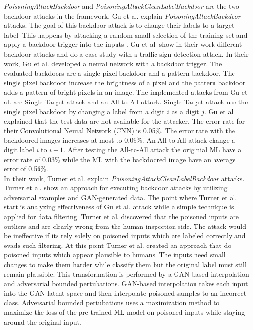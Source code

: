 \textit{PoisoningAttackBackdoor} and \textit{PoisoningAttackCleanLabelBackdoor} are the two backdoor attacks in the framework. Gu et al. \cite{DBLP:journals/corr/abs-1708-06733} explain \textit{PoisoningAttackBackdoor} attacks. The goal of this backdoor attack is to change their labels to a target label. This happens by attacking a random small selection of the training set and apply a backdoor trigger into the inputs \cite{turner2018clean}. Gu et al. show in their work different backdoor attacks and do a case study with a traffic sign detection attack. In their work, Gu et al. developed a neural network with a backdoor trigger. The evaluated backdoors are a single pixel backdoor and a pattern backdoor. The single pixel backdoor increase the brightness of a pixel and the pattern backdoor adds a pattern of bright pixels in an image. The implemented attacks from Gu et al. are Single Target attack and an All-to-All attack. Single Target attack use the single pixel backdoor by changing a label from a digit $i$ as a digit $j$. Gu et al. explained that the test data are not available for the attacker. The error rate for their Convolutional Neural Network (CNN) is 0.05\%. The error rate with the backdoored images increases at most to 0.09\%. An All-to-All attack change a digit label $i$ to $i + 1$. After testing the All-to-All attack the originial ML have a error rate of 0.03\% while the ML with the backdoored image have an average error of 0.56\%. \\
In their work, Turner et al. \cite{turner2018clean} explain
\textit{PoisoningAttackCleanLabelBackdoor} attacks. Turner et al. show an approach for executing backdoor attacks by utilizing adversarial examples and GAN-generated data. The point where Turner et al. start is analyzing effectiveness of Gu et al. attack while a simple technique is applied for data filtering. Turner et al. discovered that the poisoned inputs are outliers and are clearly wrong from the human inspection side. The attack would be ineffective if its rely solely on poisoned inputs which are labeled correctly and evade such filtering. At this point Turner et al. created an approach that do poisoned inputs which appear plausible to humans. The inputs need small changes to make them harder while classify them but the original label must still remain plausible. This transformation is performed by a GAN-based interpolation and adversarial bounded pertubations. GAN-based interpolation takes each input into the GAN latent space \cite{DBLP:conf/nips/GoodfellowPMXWOCB14} and then interpolate poisoned samples to an incorrect class. Adversarial bounded pertubations uses a maximization method to maximize the loss of the pre-trained ML model on poisoned inputs while staying around the original input.

